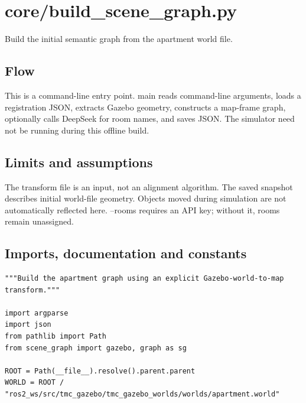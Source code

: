 \documentclass[11pt,a4paper]{book}
\begin{document}
\chapter{core/build\_scene\_graph.py}

Build the initial semantic graph from the apartment world file.

\section*{Flow}

This is a command-line entry point. main reads command-line arguments, loads a registration JSON, extracts Gazebo geometry, constructs a map-frame graph, optionally calls DeepSeek for room names, and saves JSON. The simulator need not be running during this offline build.

\section*{Limits and assumptions}

The transform file is an input, not an alignment algorithm. The saved snapshot describes initial world-file geometry. Objects moved during simulation are not automatically reflected here. --rooms requires an API key; without it, rooms remain unassigned.

\section{Imports, documentation and constants}

\begin{lstlisting}[firstnumber=1]
"""Build the apartment graph using an explicit Gazebo-world-to-map transform."""

import argparse
import json
from pathlib import Path
from scene_graph import gazebo, graph as sg

ROOT = Path(__file__).resolve().parent.parent
WORLD = ROOT / "ros2_ws/src/tmc_gazebo/tmc_gazebo_worlds/worlds/apartment.world"


\end{lstlisting}
\end{document}
